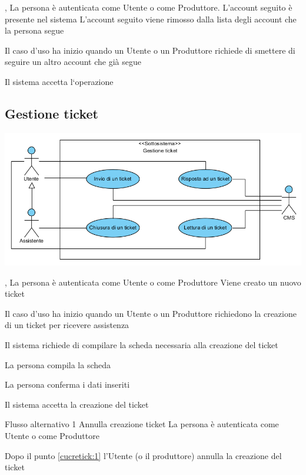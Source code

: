 \tabcuvspace

{, }
{La persona è autenticata come Utente o come Produttore. L'account seguito è presente nel sistema}
{L'account seguito viene rimosso dalla lista degli account che la persona segue}
{\begin{enumCU}
	\item Il caso d'uso ha inizio quando un Utente o un Produttore richiede di smettere di seguire un altro account che già segue
	\item Il sistema accetta l`operazione
\end{enumCU}}

\subsection{Gestione ticket}
\begin{center}
   \includegraphics[width=\textwidth]{assets/visualParadigm/GestioneTicket}
\end{center}
{, }
{La persona è autenticata come Utente o come Produttore}
{Viene creato un nuovo ticket}
{\begin{enumCU}
	\item Il caso d'uso ha inizio quando un Utente o un Produttore richiedono la creazione di un ticket per ricevere assistenza
	\item Il sistema richiede di compilare la scheda necessaria alla creazione del ticket
	\item La persona compila la scheda \label{cucretick:1}
	\item La persona conferma i dati inseriti
	\item Il sistema accetta la creazione del ticket
\end{enumCU}}
%
{Flusso alternativo 1}%
{Annulla creazione ticket}%
{La persona è autenticata come Utente o come Produttore}%
{\postNulle}%
{\begin{enumCU}
		\item Dopo il punto \ref{cucretick:1} l'Utente (o il produttore) annulla la creazione del ticket
	\end{enumCU}}%


